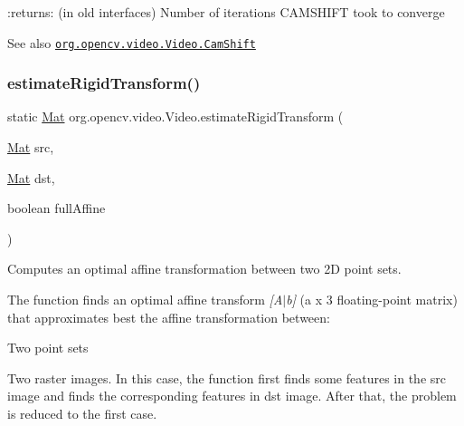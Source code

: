 \+:returns\+: (in old interfaces) Number of iterations C\+A\+M\+S\+H\+I\+FT took to converge

\begin{DoxySeeAlso}{See also}
\href{http://docs.opencv.org/modules/video/doc/motion_analysis_and_object_tracking.html#camshift}{\tt org.\+opencv.\+video.\+Video.\+Cam\+Shift} 
\end{DoxySeeAlso}
\mbox{\label{classorg_1_1opencv_1_1video_1_1_video_ad9c2fbb377a485b9619be2c78eaf7cee}} 
\subsubsection{\texorpdfstring{estimate\+Rigid\+Transform()}{estimateRigidTransform()}}
{\footnotesize\ttfamily static \mbox{\hyperlink{classorg_1_1opencv_1_1core_1_1_mat}{Mat}} org.\+opencv.\+video.\+Video.\+estimate\+Rigid\+Transform (\begin{DoxyParamCaption}\item[{\mbox{\hyperlink{classorg_1_1opencv_1_1core_1_1_mat}{Mat}}}]{src,  }\item[{\mbox{\hyperlink{classorg_1_1opencv_1_1core_1_1_mat}{Mat}}}]{dst,  }\item[{boolean}]{full\+Affine }\end{DoxyParamCaption})\hspace{0.3cm}{\ttfamily [static]}}

Computes an optimal affine transformation between two 2D point sets.

The function finds an optimal affine transform {\itshape \mbox{[}A$\vert$b\mbox{]}} (a { x 3} floating-\/point matrix) that approximates best the affine transformation between\+:


\begin{DoxyItemize}
\item Two point sets 
\item Two raster images. In this case, the function first finds some features in the {\ttfamily src} image and finds the corresponding features in {\ttfamily dst} image. After that, the problem is reduced to the first case. 
\end{DoxyItemize}

